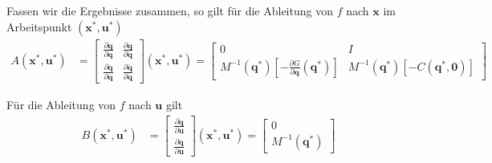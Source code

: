 \documentclass[a4paper, 12pt]{scrartcl}
\begin{document}
Fassen wir die Ergebnisse zusammen, so gilt für die Ableitung von $f$ nach $\bm{x}$ im Arbeitspunkt $(\bm{x}^*, \bm{u}^*)$
\begin{align*}
    A(\bm{x}^*, \bm{u}^*)
    &=
    \begin{bmatrix}
        \frac{\partial \dot{\bm{q}}}{\partial \bm{q}} 
        & \frac{\partial \dot{\bm{q}}}{\partial \dot{\bm{q}}} \\[6pt]
        \frac{\partial \ddot{\bm{q}}}{\partial \bm{q}} 
        & \frac{\partial \ddot{\bm{q}}}{\partial \dot{\bm{q}}}
    \end{bmatrix}
    (\bm{x}^*, \bm{u}^*) 
    =
    \begin{bmatrix}
        0 & I \\
        M^{-1}(\bm{q}^*) 
        \left[
            -\frac{\partial G}{\partial \bm{q}}(\bm{q}^*) 
        \right]
        & 
        M^{-1}(\bm{q}^*) 
        \left[
            -C(\bm{q}^*,\bm{0})
        \right]
    \end{bmatrix}   
\end{align*}

Für die Ableitung von $f$ nach $\bm{u}$ gilt
\begin{align*}
    B(\bm{x}^*, \bm{u}^*)
    &=
    \begin{bmatrix}
        \frac{\partial \dot{\bm{q}}}{\partial \bm{u}} \\[6pt]
        \frac{\partial \ddot{\bm{q}}}{\partial \bm{u}}
    \end{bmatrix}
    (\bm{x}^*, \bm{u}^*) 
    =
    \begin{bmatrix}
        0 \\[6pt]
        M^{-1}(\bm{q}^*)
    \end{bmatrix}
\end{align*}
\end{document}

